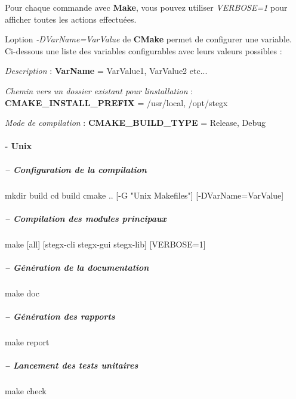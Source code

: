 Pour chaque commande avec {\bfseries Make}, vous pouvez utiliser {\itshape V\+E\+R\+B\+O\+SE=1} pour afficher toutes les actions effectuées.

L\textquotesingle{}option {\itshape -\/\+D\+Var\+Name=Var\+Value} de {\bfseries C\+Make} permet de configurer une variable. Ci-\/dessous une liste des variables configurables avec leurs valeurs possibles \+:
\begin{DoxyEnumerate}
\item {\itshape Description} \+: {\bfseries Var\+Name} = Var\+Value1, Var\+Value2 etc...
\item {\itshape Chemin vers un dossier existant pour l\textquotesingle{}installation} \+: {\bfseries C\+M\+A\+K\+E\+\_\+\+I\+N\+S\+T\+A\+L\+L\+\_\+\+P\+R\+E\+F\+IX} = /usr/local, /opt/stegx
\item {\itshape Mode de compilation} \+: {\bfseries C\+M\+A\+K\+E\+\_\+\+B\+U\+I\+L\+D\+\_\+\+T\+Y\+PE} = Release, Debug
\end{DoxyEnumerate}

\paragraph*{-\/ Unix}

\subparagraph*{-- Configuration de la compilation}

\begin{DoxyVerb}mkdir build
cd build
cmake .. [-G "Unix Makefiles"] [-DVarName=VarValue]
\end{DoxyVerb}


\subparagraph*{-- Compilation des modules principaux}

\begin{DoxyVerb}make [all] [stegx-cli stegx-gui stegx-lib] [VERBOSE=1]
\end{DoxyVerb}


\subparagraph*{-- Génération de la documentation}

\begin{DoxyVerb}make doc
\end{DoxyVerb}


\subparagraph*{-- Génération des rapports}

\begin{DoxyVerb}make report
\end{DoxyVerb}


\subparagraph*{-- Lancement des tests unitaires}

\begin{DoxyVerb}make check
\end{DoxyVerb}


